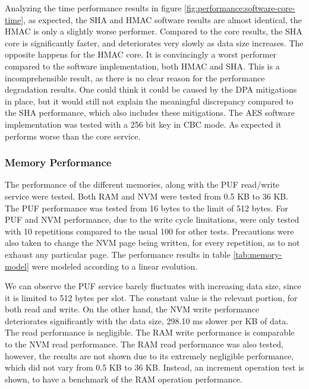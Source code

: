 Analyzing the time performance results in figure \ref{fig:performance:software-core-time}, as expected, the SHA and HMAC software results are almost identical, the HMAC is only a slightly worse performer. Compared to the core results, the SHA core is significantly faster, and deteriorates very slowly as data size increases. The opposite happens for the HMAC core. It is convincingly a worst performer compared to the software implementation, both HMAC and SHA. 
This is a incomprehensible result, as there is no clear reason for the performance degradation results. One could think it could be caused by the \ac{DPA} mitigations in place, but it would still not explain the meaningful discrepancy compared to the SHA performance, which also includes these mitigations.
The AES software implementation was tested with a 256 bit key in CBC mode. As expected it performs worse than the core service.

\subsubsection{Memory Performance}\label{chap:evaluation:services:memory}

The performance of the different memories, along with the PUF read/write service were tested. Both RAM and NVM were tested from 0.5 KB to 36 KB. The PUF performance was tested from 16 bytes to the limit of 512 bytes. For PUF and NVM performance, due to the write cycle limitations, were only tested with 10 repetitions compared to the usual 100 for other tests. Precautions were also taken to change the NVM page being written, for every repetition, as to not exhaust any particular page.
The performance results in table \ref{tab:memory-model} were modeled according to a linear evolution.



We can observe the PUF service barely fluctuates with increasing data size, since it is limited to 512 bytes per slot. The constant value is the relevant portion, for both read and write.
On the other hand, the NVM write performance deteriorates significantly with the data size, 298.10 ms slower per KB of data. The read performance is negligible.
The RAM write performance is comparable to the NVM read performance. The RAM read performance was also tested, however, the results are not shown due to its extremely negligible performance, which did not vary from 0.5 KB to 36 KB. Instead, an increment operation test is shown, to have a benchmark of the RAM operation performance.

